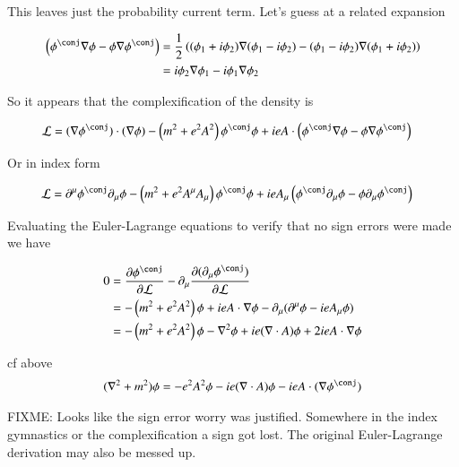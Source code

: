 \documentclass{article}
\begin{document}
This leaves just the probability current term.  Let's guess at a related expansion

\begin{align*}
\left( \phi^\conj \grad \phi - \phi \grad \phi^\conj \right)
&=
\inv{2} \left( (\phi_1 + i \phi_2) \grad (\phi_1 - i \phi_2) - (\phi_1 - i \phi_2) \grad (\phi_1 + i \phi_2) \right) \\
&=
i \phi_2 \grad \phi_1 - i \phi_1 \grad \phi_2 
\end{align*}

So it appears that the complexification of the density is

\begin{align*}
\LL 
&=
(\grad \phi^\conj) \cdot (\grad \phi)
- \left( m^2 + e^2 A^2 \right) \phi^\conj \phi
+ i e A \cdot \left( \phi^\conj \grad \phi - \phi \grad \phi^\conj \right)
\end{align*}

Or in index form

\begin{align*}
\LL 
&=
\partial^\mu \phi^\conj \partial_\mu \phi
- \left( m^2 + e^2 A^\mu A_\mu \right) \phi^\conj \phi
+ i e A_\mu \left( \phi^\conj \partial_\mu \phi - \phi \partial_\mu \phi^\conj \right)
\end{align*}

Evaluating the Euler-Lagrange equations to verify that no sign errors were made we have

\begin{align*}
0 
&=
\PD{\phi^\conj}{\LL}
- \partial_\mu \PD{(\partial_\mu \phi^\conj)}{\LL} \\
&=
- \left( m^2 + e^2 A^2 \right) \phi 
+ i e A \cdot \grad \phi
- \partial_\mu (\partial^\mu \phi - i e A_\mu \phi) \\
&=
- \left( m^2 + e^2 A^2 \right) \phi
- \grad^2 \phi 
+ i e (\grad \cdot A) \phi 
+ 2 i e A \cdot \grad \phi
\\
\end{align*}

cf above
\begin{align*}
(\grad^2 + m^2) \phi &= -e^2 A^2 \phi -i e (\grad \cdot A) \phi - i e A \cdot (\grad \phi^\conj) \\
\end{align*}

FIXME:
Looks like the sign error worry was justified.  Somewhere in the index gymnastics or the complexification a sign got lost.
The original Euler-Lagrange derivation may also be messed up.



\end{document}
